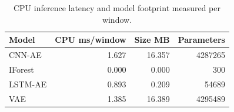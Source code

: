 \begin{table}[t]
\centering
\caption{CPU inference latency and model footprint measured per window.}
\label{tab:efficiency}
\small
\begin{tabular}{lrrr}
\toprule
Model & CPU ms/window & Size MB & Parameters \\
\midrule
CNN-AE & 1.627 & 16.357 & 4287265 \\
IForest & 0.000 & 0.000 & 300 \\
LSTM-AE & 0.893 & 0.209 & 54689 \\
VAE & 1.385 & 16.389 & 4295489 \\
\bottomrule
\end{tabular}
\end{table}